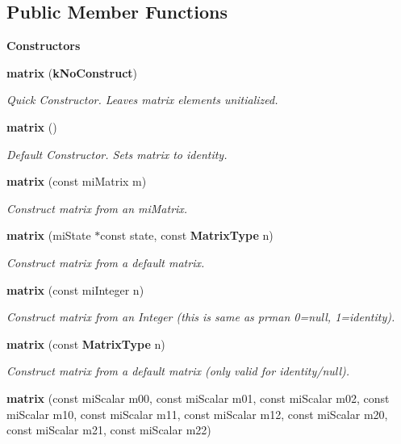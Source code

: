 \subsection*{Public Member Functions}
\begin{Indent}{\bf Constructors}\par
\begin{CompactItemize}
\item 
{\bf matrix} ({\bf k\-No\-Construct})
\begin{CompactList}\small\item\em Quick Constructor. Leaves matrix elements unitialized. \item\end{CompactList}\item 
{\bf matrix} ()
\begin{CompactList}\small\item\em Default Constructor. Sets matrix to identity. \item\end{CompactList}\item 
{\bf matrix} (const mi\-Matrix m)
\begin{CompactList}\small\item\em Construct matrix from an mi\-Matrix. \item\end{CompactList}\item 
{\bf matrix} (mi\-State $\ast$const state, const {\bf Matrix\-Type} n)
\begin{CompactList}\small\item\em Construct matrix from a default matrix. \item\end{CompactList}\item 
{\bf matrix} (const mi\-Integer n)
\begin{CompactList}\small\item\em Construct matrix from an Integer (this is same as prman 0=null, 1=identity). \item\end{CompactList}\item 
{\bf matrix} (const {\bf Matrix\-Type} n)
\begin{CompactList}\small\item\em Construct matrix from a default matrix (only valid for identity/null). \item\end{CompactList}\item 
{\bf matrix} (const mi\-Scalar m00, const mi\-Scalar m01, const mi\-Scalar m02, const mi\-Scalar m10, const mi\-Scalar m11, const mi\-Scalar m12, const mi\-Scalar m20, const mi\-Scalar m21, const mi\-Scalar m22)

\end{CompactItemize}
\end{Indent}
